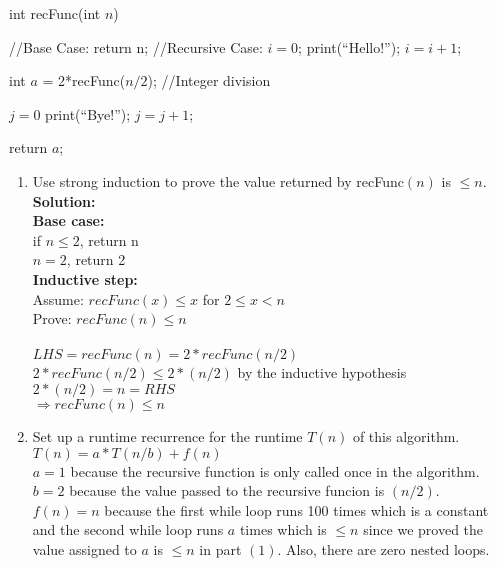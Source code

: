 \documentclass[12pt]{elsart}
\begin{document}
\begin{algorithm}
\caption{int recFunc(int $n$)}
 \begin{algorithmic}
 \State //Base Case:
    \State return n;
 \EndIf
 \State //Recursive Case:
 \State $i = 0$;
    \State print(``Hello!'');
    \State $i = i + 1$;
  \EndWhile

  \State int $a$ = 2*recFunc($n/2$); //Integer division

    \State $j = 0$
    \State print(``Bye!'');
    \State $j = j + 1$;
  \EndWhile

 \State return $a$;

\end{algorithmic}
\end{algorithm}
\newpage
\begin{enumerate}
 \item Use strong induction to prove the value returned by recFunc$(n)$ is $\leq n$.\\
	{\bf Solution:}\\
	{\bf Base case:}\\ 
	if $n \leq 2$, return n\\
	$n=2$, return 2\\
	{\bf Inductive step:}\\
	Assume: $recFunc(x) \leq x$ for $ 2 \leq x < n$\\
	Prove: $recFunc(n) \leq n$\\\\
	$LHS = recFunc(n) = 2*recFunc(n/2)$\\
	$2*recFunc(n/2) \leq 2*(n/2)$ by the inductive hypothesis\\
	$2*(n/2) = n = RHS$\\
	$\Rightarrow \boxed{recFunc(n) \leq n}$\\
 \item Set up a runtime recurrence for the runtime $T(n)$ of this algorithm.\\
	$T(n) = a*T(n/b)+f(n)$\\
	$a=1$ because the recursive function is only called once in the algorithm.\\
	$b=2$ because the value passed to the recursive funcion is $(n/2)$.\\
	$f(n) = n$ because the first while loop runs 100 times which is a constant and the second while loop runs $a$ times which is $\leq n$ since we proved the value assigned to $a$ is $\leq n$ in part $(1)$. Also, there are zero nested loops.\\

\end{enumerate}
\end{document}
